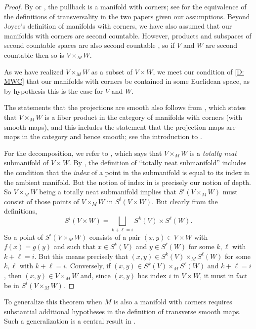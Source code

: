 \begin{proof}
	By \cite[Theorem 6.4]{Joy12} or \cite[Theorem 7.2.7]{MaDo92}, the pullback is a manifold with corners; see \cite[Remark 6.3]{Joy12} for the equivalence of the definitions of transversality in the two papers given our assumptions.
	Beyond Joyce's definition of manifolds with corners, we have also assumed that our manifolds with corners are second countable.
	However, products and subspaces of second countable spaces are also second countable \cite[Theorem 30.2]{Mu00}, so if $V$ and $W$ are second countable then so is $V \times_M W$.

	As we have realized $V \times_M W$ as a subset of $V \times W$, we meet our condition of \cref{D: MWC} that our manifolds with corners be contained in some Euclidean space, as by hypothesis this is the case for $V$ and $W$.

	The statements that the projections are smooth also follows from \cite[Theorem 6.4]{Joy12}, which states that $V\times_MW$ is a fiber product in the category of manifolds with corners (with smooth maps), and this includes the statement that the projection maps are maps in the category and hence smooth; see the introduction to \cite[Section 6]{Joy12}.

	For the decomposition, we refer to \cite[Theorem 7.2.7.a]{MaDo92}, which says that $V\times_MW$ is a \textit{totally neat} submanifold of $V\times W$.
	By \cite[Definition 3.1.10]{MaDo92}, the definition of ``totally neat submanifold'' includes the condition that the \textit{index} of a point in the submanifold is equal to its index in the ambient manifold.
	But the notion of index in \cite{MaDo92} is precisely our notion of depth. So $V\times_MW$ being a totally neat submanifold implies that $S^i(V\times_MW)$ must consist of those points of $V\times_MW$ in $S^i(V\times W)$.
	But clearly from the definitions,
	$$S^i(V\times W)=\bigsqcup_{k + \ell = i} S^k(V) \times S^\ell(W).$$
	So a point of $S^i(V\times_M W)$ consists of a pair $(x,y)\in V\times W$ with $f(x)=g(y)$ and such that $x\in S^k(V)$ and $y\in S^\ell(W)$ for some $k,\ell$ with $k+\ell=i$.
	But this means precisely that $(x,y)\in S^k(V) \times_M S^\ell(W)$ for some $k,\ell$ with $k+\ell=i$.
	Conversely, if $(x,y)\in S^k(V) \times_M S^\ell(W)$ and $k+\ell=i$, then $(x,y)\in V\times_MW$ and, since $(x,y)$ has index $i$ in $V\times W$, it must in fact be in $S^i(V\times_M W)$.
\end{proof}

To generalize this theorem when $M$ is also a manifold with corners requires substantial additional hypotheses in the definition of transverse smooth maps.
Such a generalization is a central result in \cite{Joy12}.


